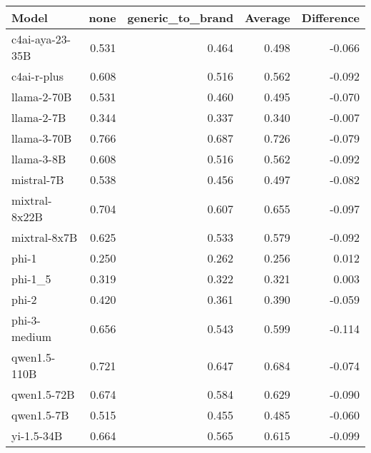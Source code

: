 \begin{tabular}{lrrrr}
\toprule
Model & none & generic_to_brand & Average & Difference \\
\midrule
c4ai-aya-23-35B & 0.531 & 0.464 & 0.498 & -0.066 \\
c4ai-r-plus & 0.608 & 0.516 & 0.562 & -0.092 \\
llama-2-70B & 0.531 & 0.460 & 0.495 & -0.070 \\
llama-2-7B & 0.344 & 0.337 & 0.340 & -0.007 \\
llama-3-70B & 0.766 & 0.687 & 0.726 & -0.079 \\
llama-3-8B & 0.608 & 0.516 & 0.562 & -0.092 \\
mistral-7B & 0.538 & 0.456 & 0.497 & -0.082 \\
mixtral-8x22B & 0.704 & 0.607 & 0.655 & -0.097 \\
mixtral-8x7B & 0.625 & 0.533 & 0.579 & -0.092 \\
phi-1 & 0.250 & 0.262 & 0.256 & 0.012 \\
phi-1_5 & 0.319 & 0.322 & 0.321 & 0.003 \\
phi-2 & 0.420 & 0.361 & 0.390 & -0.059 \\
phi-3-medium & 0.656 & 0.543 & 0.599 & -0.114 \\
qwen1.5-110B & 0.721 & 0.647 & 0.684 & -0.074 \\
qwen1.5-72B & 0.674 & 0.584 & 0.629 & -0.090 \\
qwen1.5-7B & 0.515 & 0.455 & 0.485 & -0.060 \\
yi-1.5-34B & 0.664 & 0.565 & 0.615 & -0.099 \\
\bottomrule
\end{tabular}
